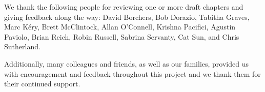 We thank the following people for reviewing one or more draft chapters
and giving feedback along the way:
David Borchers,
Bob Dorazio,
Tabitha Graves,
Marc K\'{e}ry,   
Brett McClintock,
Allan O'Connell,
Krishna Pacifici,
Agustin Paviolo,
Brian Reich,
Robin Russell,
Sabrina Servanty,
Cat Sun,
and
Chris Sutherland.



Additionally, many colleagues and friends, as well as our families, provided us with encouragement and 
feedback throughout this project and
we thank them for their continued support.
